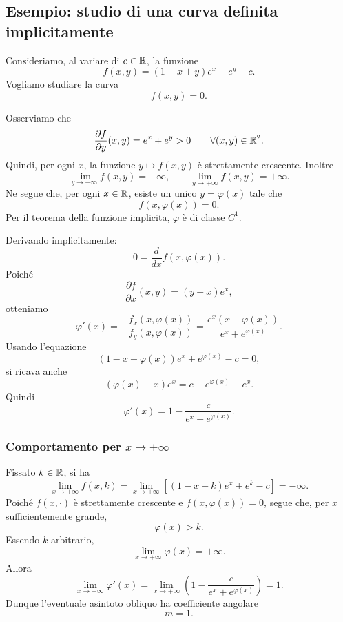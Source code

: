 \documentclass[a4paper]{article}
\begin{document}
\subsection{Esempio: studio di una curva definita implicitamente}

Consideriamo, al variare di \(c\in\mathbb{R}\), la funzione
\[
    f(x,y)=(1-x+y)e^x+e^y-c.
\]
Vogliamo studiare la curva
\[
    f(x,y)=0.
\]

Osserviamo che
\[
    \frac{\partial f}{\partial y}(x,y)
    =
    e^x+e^y>0
    \qquad
    \forall (x,y)\in\mathbb{R}^2.
\]
Quindi, per ogni \(x\), la funzione \(y\mapsto f(x,y)\) è strettamente crescente. Inoltre
\[
    \lim_{y\to-\infty}f(x,y)=-\infty,
    \qquad
    \lim_{y\to+\infty}f(x,y)=+\infty.
\]
Ne segue che, per ogni \(x\in\mathbb{R}\), esiste un unico \(y=\varphi(x)\) tale che
\[
    f(x,\varphi(x))=0.
\]
Per il teorema della funzione implicita, \(\varphi\) è di classe \(C^1\).

Derivando implicitamente:
\[
    0
    =
    \frac{d}{dx}f(x,\varphi(x)).
\]
Poiché
\[
    \frac{\partial f}{\partial x}(x,y)
    =
    (y-x)e^x,
\]
otteniamo
\[
    \varphi'(x)
    =
    -\frac{f_x(x,\varphi(x))}{f_y(x,\varphi(x))}
    =
    \frac{e^x(x-\varphi(x))}{e^x+e^{\varphi(x)}}.
\]
Usando l'equazione
\[
    (1-x+\varphi(x))e^x+e^{\varphi(x)}-c=0,
\]
si ricava anche
\[
    (\varphi(x)-x)e^x
    =
    c-e^{\varphi(x)}-e^x.
\]
Quindi
\[
    \varphi'(x)
    =
    1-\frac{c}{e^x+e^{\varphi(x)}}.
\]

\subsubsection{Comportamento per \(x\to+\infty\)}

Fissato \(k\in\mathbb{R}\), si ha
\[
    \lim_{x\to+\infty}f(x,k)
    =
    \lim_{x\to+\infty}\left[(1-x+k)e^x+e^k-c\right]
    =
    -\infty.
\]
Poiché \(f(x,\cdot)\) è strettamente crescente e \(f(x,\varphi(x))=0\), segue che, per \(x\) sufficientemente grande,
\[
    \varphi(x)>k.
\]
Essendo \(k\) arbitrario,
\[
    \lim_{x\to+\infty}\varphi(x)=+\infty.
\]
Allora
\[
    \lim_{x\to+\infty}\varphi'(x)
    =
    \lim_{x\to+\infty}
    \left(
        1-\frac{c}{e^x+e^{\varphi(x)}}
    \right)
    =
    1.
\]
Dunque l'eventuale asintoto obliquo ha coefficiente angolare
\[
    m=1.
\]
\end{document}
